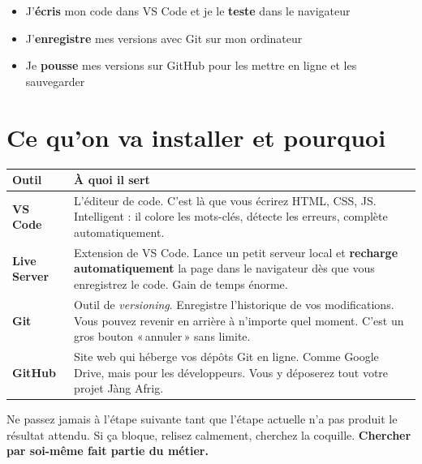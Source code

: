 \documentclass[11pt,a4paper]{article}
\begin{document}
\begin{retenirbox}[À retenir]
\begin{itemize}[nosep]
    \item J'\textbf{écris} mon code dans VS Code et je le \textbf{teste} dans le navigateur
    \item J'\textbf{enregistre} mes versions avec Git sur mon ordinateur
    \item Je \textbf{pousse} mes versions sur GitHub pour les mettre en ligne et les sauvegarder
\end{itemize}
\end{retenirbox}

\newpage

\section{Ce qu'on va installer et pourquoi}

\begin{center}
\begin{tabular}{@{}lp{8cm}@{}}
\toprule
\textbf{Outil} & \textbf{À quoi il sert} \\
\midrule
\textbf{VS Code} & L'éditeur de code. C'est là que vous écrirez HTML, CSS, JS. Intelligent : il colore les mots-clés, détecte les erreurs, complète automatiquement. \\
\addlinespace
\textbf{Live Server} & Extension de VS Code. Lance un petit serveur local et \textbf{recharge automatiquement} la page dans le navigateur dès que vous enregistrez le code. Gain de temps énorme. \\
\addlinespace
\textbf{Git} & Outil de \emph{versioning}. Enregistre l'historique de vos modifications. Vous pouvez revenir en arrière à n'importe quel moment. C'est un gros bouton «\,annuler\,» sans limite. \\
\addlinespace
\textbf{GitHub} & Site web qui héberge vos dépôts Git en ligne. Comme Google Drive, mais pour les développeurs. Vous y déposerez tout votre projet Jàng Afrig. \\
\bottomrule
\end{tabular}
\end{center}

\begin{attentionbox}[Règle d'or]
Ne passez jamais à l'étape suivante tant que l'étape actuelle n'a pas
produit le résultat attendu. Si ça bloque, relisez calmement, cherchez la
coquille. \textbf{Chercher par soi-même fait partie du métier.}
\end{attentionbox}
\end{document}
